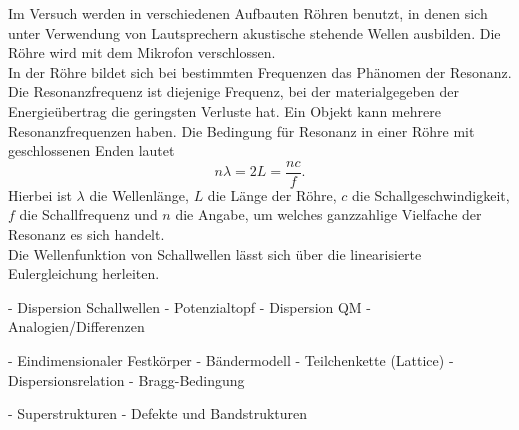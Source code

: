 Im Versuch werden in verschiedenen Aufbauten Röhren benutzt, in denen sich unter Verwendung von Lautsprechern akustische stehende Wellen ausbilden.
Die Röhre wird mit dem Mikrofon verschlossen.\\
%
In der Röhre bildet sich bei bestimmten Frequenzen das Phänomen der Resonanz.
Die Resonanzfrequenz ist diejenige Frequenz, bei der materialgegeben der Energieübertrag die geringsten Verluste hat.
Ein Objekt kann mehrere Resonanzfrequenzen haben.
Die Bedingung für Resonanz in einer Röhre mit geschlossenen Enden lautet
\begin{equation*}
  n \lambda = 2 L = \frac{n c}{f}.
\end{equation*}
Hierbei ist $\lambda$ die Wellenlänge, $L$ die Länge der Röhre, $c$ die Schallgeschwindigkeit, $f$ die Schallfrequenz und $n$ die Angabe, um welches ganzzahlige Vielfache der Resonanz es sich handelt.\\
%
Die Wellenfunktion von Schallwellen lässt sich über die linearisierte Eulergleichung herleiten.

    - Dispersion Schallwellen
- Potenzialtopf
    - Dispersion QM
- Analogien/Differenzen

- Eindimensionaler Festkörper
    - Bändermodell
    - Teilchenkette (Lattice)
    - Dispersionsrelation
    - Bragg-Bedingung

- Superstrukturen
    - Defekte und Bandstrukturen
